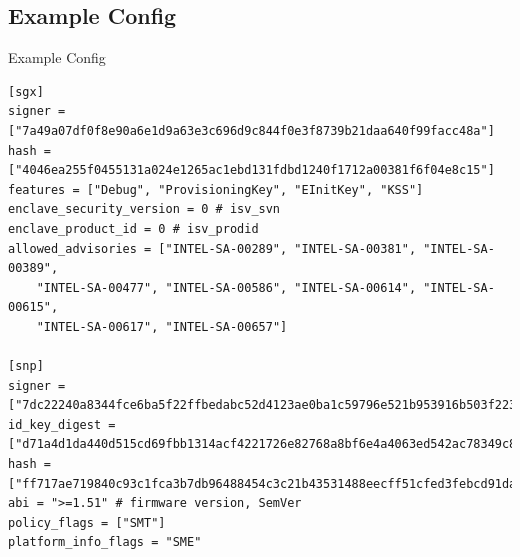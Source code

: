 \documentclass[graphics,compress]{beamer}
\begin{document}
\subsection{Example Config}
\begin{frame}[fragile]{Example Config}
    \begin{verbatim}
[sgx]
signer = ["7a49a07df0f8e90a6e1d9a63e3c696d9c844f0e3f8739b21daa640f99facc48a"]
hash = ["4046ea255f0455131a024e1265ac1ebd131fdbd1240f1712a00381f6f04e8c15"]
features = ["Debug", "ProvisioningKey", "EInitKey", "KSS"]
enclave_security_version = 0 # isv_svn
enclave_product_id = 0 # isv_prodid
allowed_advisories = ["INTEL-SA-00289", "INTEL-SA-00381", "INTEL-SA-00389",
    "INTEL-SA-00477", "INTEL-SA-00586", "INTEL-SA-00614", "INTEL-SA-00615",
    "INTEL-SA-00617", "INTEL-SA-00657"]

[snp]
signer = ["7dc22240a8344fce6ba5f22ffbedabc52d4123ae0ba1c59796e521b953916b503f223b15c4429e7d8c5489ad71f1e193"]
id_key_digest = ["d71a4d1da440d515cd69fbb1314acf4221726e82768a8bf6e4a4063ed542ac78349c8145b4666a4242a91a374387b473"]
hash = ["ff717ae719840c93c1fca3b7db96488454c3c21b43531488eecff51cfed3febcd91da8be87a4cbcbc52a3bae770987c3"]
abi = ">=1.51" # firmware version, SemVer
policy_flags = ["SMT"]
platform_info_flags = "SME"
    \end{verbatim}
\end{frame}
\end{document}
